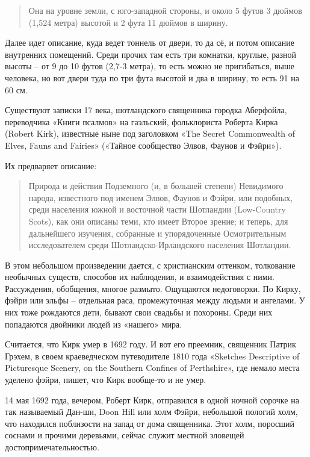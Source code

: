 \begin{quotation}
Она на уровне земли, с юго-западной стороны, и около 5 футов 3 дюймов (1,524 метра) высотой и 2 фута 11 дюймов в ширину.
\end{quotation}

Далее идет описание, куда ведет тоннель от двери, то да сё, и потом описание внутренних помещений. Среди прочих там есть три комнатки, круглые, разной высоты – от 9 до 10 футов (2,7-3 метра), то есть можно не пригибаться, выше человека, но вот двери туда по три фута высотой и два в ширину, то есть 91 на 60 см. 

Существуют записки 17 века, шотландского священника городка Аберфойла, переводчика «Книги псалмов» на гаэльский, фольклориста Роберта Кирка (Robert Kirk), известные ныне под заголовком «The Secret Commonwe\-alth of Elves, Fauns and Fairies» («Тайное сообщество Элвов, Фаунов и Фэйри»).

Их предваряет описание:

\begin{quotation}
Природа и действия Подземного (и, в большей степени) Невидимого народа, известного под именем Элвов, Фаунов и Фэйри, или подобных, среди населения южной и восточной части Шотландии (Low-Country Scots), как они описаны теми, кто имеет Второе зрение; и теперь, для дальнейшего изучения, собранные и упорядоченные Осмотрительным исследователем среди Шотландско-Ирландского населения Шотландии. 
\end{quotation}

В этом небольшом произведении дается, с христианским оттенком, толкование необычных существ, способов их наблюдения, и взаимодействия с ними. Рассуждения, обобщения, многое размыто. Ощущаются недоговорки. По Кирку, фэйри или эльфы – отдельная раса, промежуточная между людьми и ангелами. У них тоже рождаются дети, бывают свои свадьбы и похороны. Среди них попадаются двойники людей из «нашего» мира.

Считается, что Кирк умер в 1692 году. И вот его преемник, священник Патрик Грэхем, в своем краеведческом путеводителе 1810 года «Sketches Descriptive of Picturesque Scenery, on the Southern Confines of Perthshi\-re», где немало места уделено фэйри, пишет, что Кирк вообще-то и не умер.


14 мая 1692 года, вечером, Роберт Кирк, отправился в одной ночной сорочке на так называемый Дан-ши, Doon Hill или холм Фэйри, небольшой пологий холм, что находился поблизости на запад от дома священника. Этот холм, поросший соснами и прочими деревьями, сейчас служит местной зловещей достопримечательностью.

